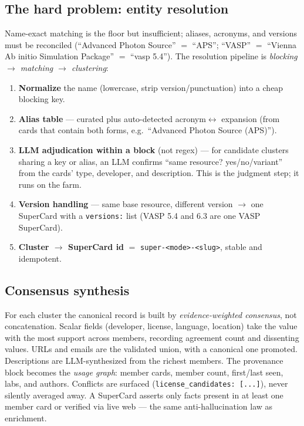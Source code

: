 \documentclass[11pt,letterpaper]{article}
\newcommand{\code}[1]{\texttt{\small #1}}
\begin{document}
\subsection{The hard problem: entity resolution}

Name-exact matching is the floor but insufficient; aliases, acronyms, and versions
must be reconciled (``Advanced Photon Source'' $=$ ``APS''; ``VASP'' $=$ ``Vienna Ab
initio Simulation Package'' $=$ ``vasp 5.4''). The resolution pipeline is
\emph{blocking $\rightarrow$ matching $\rightarrow$ clustering}:

\begin{enumerate}[noitemsep,topsep=2pt]
\item \textbf{Normalize} the name (lowercase, strip version/punctuation) into a cheap
  blocking key.
\item \textbf{Alias table} --- curated plus auto-detected acronym$\leftrightarrow$
  expansion (from cards that contain both forms, e.g.\ ``Advanced Photon Source
  (APS)'').
\item \textbf{LLM adjudication within a block} (not regex) --- for candidate clusters
  sharing a key or alias, an LLM confirms ``same resource? yes/no/variant'' from the
  cards' type, developer, and description. This is the judgment step; it runs on the
  farm.
\item \textbf{Version handling} --- same base resource, different version $\rightarrow$
  one SuperCard with a \code{versions:} list (VASP 5.4 and 6.3 are one VASP
  SuperCard).
\item \textbf{Cluster $\rightarrow$ SuperCard id} $=$ \code{super-<mode>-<slug>},
  stable and idempotent.
\end{enumerate}

\subsection{Consensus synthesis}

For each cluster the canonical record is built by \emph{evidence-weighted consensus},
not concatenation. Scalar fields (developer, license, language, location) take the
value with the most support across members, recording agreement count and dissenting
values. URLs and emails are the validated union, with a canonical one promoted.
Descriptions are LLM-synthesized from the richest members. The provenance block
becomes the \emph{usage graph}: member cards, member count, first/last seen, labs,
and authors. Conflicts are surfaced (\code{license\_candidates: [...]}), never
silently averaged away. A SuperCard asserts only facts present in at least one member
card or verified via live web --- the same anti-hallucination law as enrichment.
\end{document}
